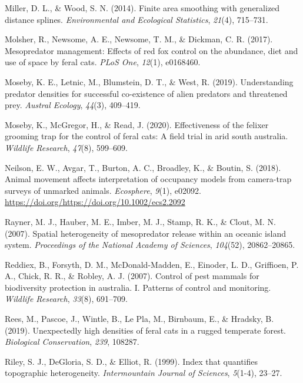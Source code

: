 \documentclass[]{elsarticle} %
\begin{document}
\leavevmode\hypertarget{ref-miller2014}{}%
Miller, D. L., \& Wood, S. N. (2014). Finite area smoothing with generalized distance splines. \emph{Environmental and Ecological Statistics}, \emph{21}(4), 715--731.

\leavevmode\hypertarget{ref-molsher2017}{}%
Molsher, R., Newsome, A. E., Newsome, T. M., \& Dickman, C. R. (2017). Mesopredator management: Effects of red fox control on the abundance, diet and use of space by feral cats. \emph{PLoS One}, \emph{12}(1), e0168460.

\leavevmode\hypertarget{ref-moseby2019}{}%
Moseby, K. E., Letnic, M., Blumstein, D. T., \& West, R. (2019). Understanding predator densities for successful co-existence of alien predators and threatened prey. \emph{Austral Ecology}, \emph{44}(3), 409--419.

\leavevmode\hypertarget{ref-moseby2020effectiveness}{}%
Moseby, K., McGregor, H., \& Read, J. (2020). Effectiveness of the felixer grooming trap for the control of feral cats: A field trial in arid south australia. \emph{Wildlife Research}, \emph{47}(8), 599--609.

\leavevmode\hypertarget{ref-https:ux2fux2fdoi.orgux2f10.1002ux2fecs2.2092}{}%
Neilson, E. W., Avgar, T., Burton, A. C., Broadley, K., \& Boutin, S. (2018). Animal movement affects interpretation of occupancy models from camera-trap surveys of unmarked animals. \emph{Ecosphere}, \emph{9}(1), e02092. \url{https://doi.org/https://doi.org/10.1002/ecs2.2092}

\leavevmode\hypertarget{ref-rayner2007}{}%
Rayner, M. J., Hauber, M. E., Imber, M. J., Stamp, R. K., \& Clout, M. N. (2007). Spatial heterogeneity of mesopredator release within an oceanic island system. \emph{Proceedings of the National Academy of Sciences}, \emph{104}(52), 20862--20865.

\leavevmode\hypertarget{ref-reddiex2007}{}%
Reddiex, B., Forsyth, D. M., McDonald-Madden, E., Einoder, L. D., Griffioen, P. A., Chick, R. R., \& Robley, A. J. (2007). Control of pest mammals for biodiversity protection in australia. I. Patterns of control and monitoring. \emph{Wildlife Research}, \emph{33}(8), 691--709.

\leavevmode\hypertarget{ref-rees2019}{}%
Rees, M., Pascoe, J., Wintle, B., Le Pla, M., Birnbaum, E., \& Hradsky, B. (2019). Unexpectedly high densities of feral cats in a rugged temperate forest. \emph{Biological Conservation}, \emph{239}, 108287.

\leavevmode\hypertarget{ref-riley1999}{}%
Riley, S. J., DeGloria, S. D., \& Elliot, R. (1999). Index that quantifies topographic heterogeneity. \emph{Intermountain Journal of Sciences}, \emph{5}(1-4), 23--27.
\end{document}
